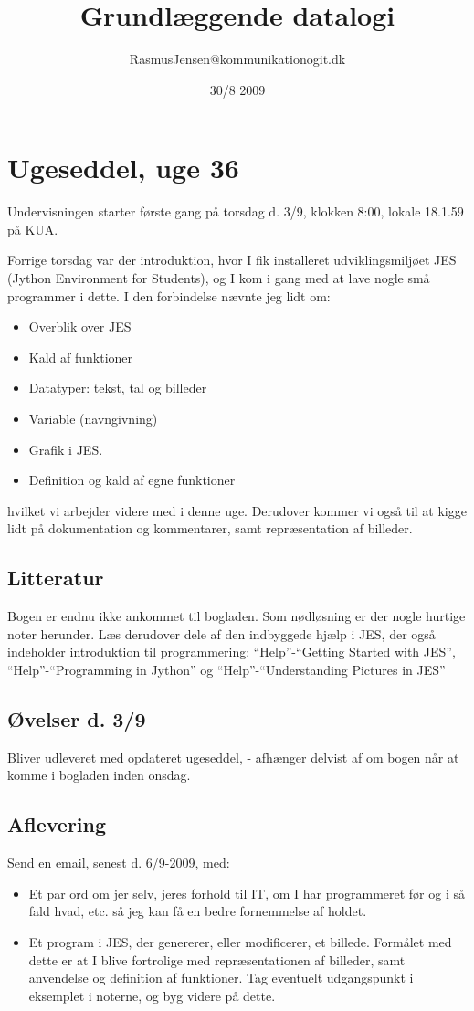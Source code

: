 \documentclass[10pt]{article}
\title{Grundlæggende datalogi}
\author{RasmusJensen@kommunikationogit.dk}
\date{30/8 2009}
\begin{document}
\maketitle
\tableofcontents

\section{Ugeseddel, uge 36}
Undervisningen starter første gang på torsdag d. 3/9, klokken 8:00, lokale 18.1.59 på KUA.

Forrige torsdag var der introduktion, hvor I fik installeret udviklingsmiljøet JES (Jython Environment for Students), og I kom i gang med at lave nogle små programmer i dette.
I den forbindelse nævnte jeg lidt om:
\begin{itemize}
\item Overblik over JES
\item Kald af funktioner
\item Datatyper: tekst, tal og billeder
\item Variable (navngivning)
\item Grafik i JES.
\item Definition og kald af egne funktioner
\end{itemize}
hvilket vi arbejder videre med i denne uge. 
Derudover kommer vi også til at kigge lidt på dokumentation og kommentarer, samt repræsentation af billeder.


\subsection{Litteratur} 
Bogen er endnu ikke ankommet til bogladen.
Som nødløsning er der nogle hurtige noter herunder.
Læs derudover dele af den indbyggede hjælp i JES, der også indeholder introduktion til programmering: ``Help''-``Getting Started with JES'',  ``Help''-``Programming in Jython'' og ``Help''-``Understanding Pictures in JES''

\subsection{Øvelser d. 3/9}
Bliver udleveret med opdateret ugeseddel, - afhænger delvist af om bogen når at komme i bogladen inden onsdag.

\subsection{Aflevering}
Send en email, senest d. 6/9-2009, med:
\begin{itemize}
\item Et par ord om jer selv, jeres forhold til IT, om I har programmeret før og i så fald hvad, etc. så jeg kan få en bedre fornemmelse af holdet.
\item Et program i JES, der genererer, eller modificerer, et billede. 
Formålet med dette er at I blive fortrolige med repræsentationen af billeder, samt anvendelse og definition af funktioner. 
Tag eventuelt udgangspunkt i eksemplet i noterne, og byg videre på dette.
\end{itemize}
\end{document}

